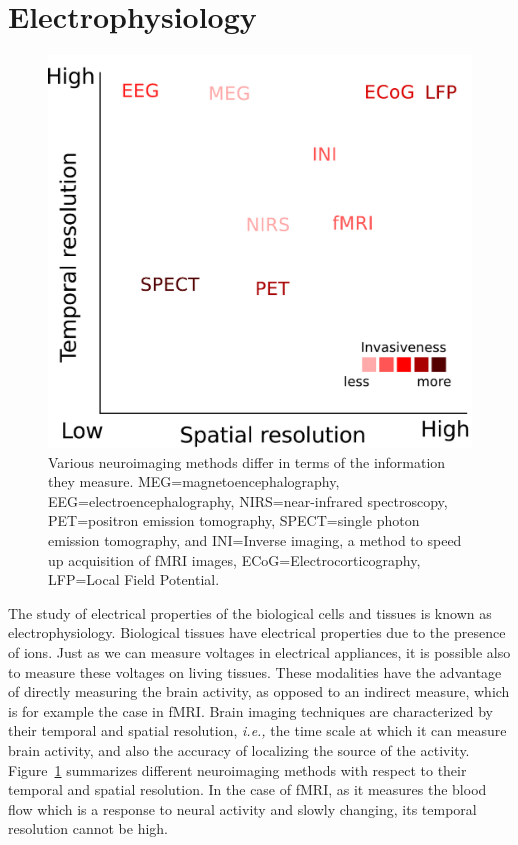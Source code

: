 
\clearpage

\section{Electrophysiology}

\begin{figure}[htb]
\begin{center}
   \includegraphics[width=0.5\linewidth]{figures/neuroimaging_methods.pdf}
\end{center}
   \caption[Various neuroimaging methods differ in terms of the information they measure.]{Various neuroimaging methods differ in terms of the information they measure. MEG=magnetoencephalography, EEG=electroencephalography, NIRS=near-infrared spectroscopy, PET=positron emission tomography, SPECT=single photon emission tomography, and INI=Inverse imaging, a method to speed up acquisition of fMRI images, ECoG=Electrocorticography, LFP=Local Field Potential.}
   \label{fig:neuroimaging_methods}
\end{figure}

The study of electrical properties of the biological cells and tissues is known as electrophysiology. Biological tissues have electrical properties due to the presence of ions. Just as we can measure voltages in electrical appliances, it is possible also to measure these voltages on living tissues. These modalities have the advantage of directly measuring the brain activity, as opposed to an indirect measure, which is for example the case in \ac{fMRI}.
Brain imaging techniques are characterized by their temporal and spatial resolution, \textit{i.e.,} the time scale at which it can measure brain activity, and also the accuracy of localizing the source of the activity. Figure~\ref{fig:neuroimaging_methods} summarizes different neuroimaging methods with respect to their temporal and spatial resolution. In the case of \ac{fMRI}, as it measures the blood flow which is a response to neural activity and slowly changing, its temporal resolution cannot be high. 

